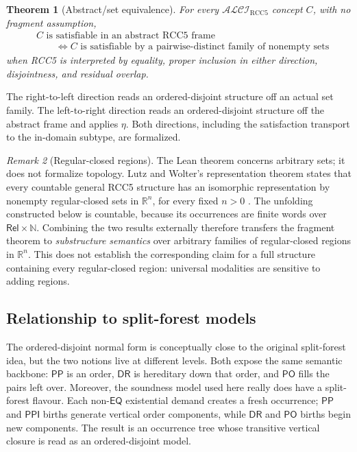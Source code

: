 \documentclass[11pt]{article}
\theoremstyle{plain}
\newtheorem{theorem}{Theorem}[section]
\theoremstyle{definition}
\theoremstyle{remark}
\newtheorem{remark}[theorem]{Remark}
\newcommand{\Logic}{\ensuremath{\mathcal{ALCI}_{\mathrm{RCC5}}}}
\newcommand{\Rel}{\ensuremath{\mathsf{Rel}}}
\newcommand{\EQ}{\ensuremath{\mathsf{EQ}}}
\newcommand{\PP}{\ensuremath{\mathsf{PP}}}
\newcommand{\PPI}{\ensuremath{\mathsf{PPI}}}
\newcommand{\PO}{\ensuremath{\mathsf{PO}}}
\newcommand{\DR}{\ensuremath{\mathsf{DR}}}
\begin{document}
\begin{theorem}[Abstract/set equivalence]
\label{thm:setequiv}
For every $\Logic$ concept $C$, with no fragment assumption,
\begin{align*}
 &C\text{ is satisfiable in an abstract RCC5 frame}\\
 &\qquad\Longleftrightarrow
 C\text{ is satisfiable by a pairwise-distinct family of nonempty sets}
\end{align*}
when RCC5 is interpreted by equality, proper inclusion in either direction,
disjointness, and residual overlap.
\end{theorem}

The right-to-left direction reads an ordered-disjoint structure off an actual
set family.  The left-to-right direction reads an ordered-disjoint structure
off the abstract frame and applies $\eta$.  Both directions, including the
satisfaction transport to the in-domain subtype, are formalized.

\begin{remark}[Regular-closed regions]
\label{rem:regularclosed}
The Lean theorem concerns arbitrary sets; it does not formalize topology.
Lutz and Wolter's representation theorem states that every countable general
RCC5 structure has an isomorphic representation by nonempty regular-closed
sets in $\mathbb R^n$, for every fixed $n>0$ \cite[Theorem~23]{LutzWolter2006}.
The unfolding constructed below is countable, because its occurrences are
finite words over $\Rel\times\mathbb N$.  Combining the two results externally
therefore transfers the fragment theorem to \emph{substructure semantics}
over arbitrary families of regular-closed regions in $\mathbb R^n$.  This does
not establish the corresponding claim for a full structure containing every
regular-closed region: universal modalities are sensitive to adding regions.
\end{remark}

\subsection{Relationship to split-forest models}
\label{sec:splitforest}

The ordered-disjoint normal form is conceptually close to the original
split-forest idea, but the two notions live at different levels.  Both expose
the same semantic backbone: $\PP$ is an order, $\DR$ is hereditary down that
order, and $\PO$ fills the pairs left over.  Moreover, the soundness model used
here really does have a split-forest flavour.  Each non-$\EQ$ existential
demand creates a fresh occurrence; $\PP$ and $\PPI$ births generate vertical
order components, while $\DR$ and $\PO$ births begin new components.  The
result is an occurrence tree whose transitive vertical closure is read as an
ordered-disjoint model.
\end{document}
